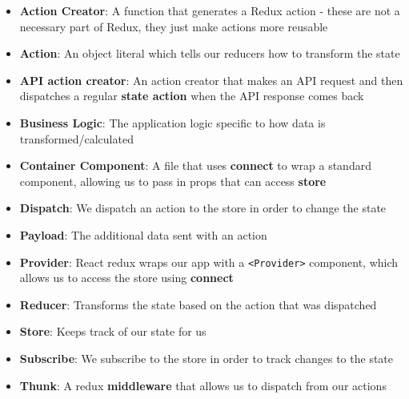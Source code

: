 \begin{itemize}[leftmargin=*]
    \item
        \textbf{Action Creator}:
        A function that generates a Redux action - these are not a necessary part of Redux, they just make actions more reusable
    \item
        \textbf{Action}:
        An object literal which tells our reducers how to transform the state
    \item
        \textbf{API action creator}:
        An action creator that makes an API request and then dispatches a regular \textbf{state action} when the API response comes back
    \item
        \textbf{Business Logic}:
        The application logic specific to how data is transformed/calculated
    \item
        \textbf{Container Component}:
        A file that uses \textbf{connect} to wrap a standard component, allowing us to pass in props that can access \textbf{store}
    \item
        \textbf{Dispatch}:
        We dispatch an action to the store in order to change the state
    \item
        \textbf{Payload}:
        The additional data sent with an action
    \item
        \textbf{Provider}:
        React redux wraps our app with a \texttt{<Provider>} component, which allows us to access the store using \textbf{connect}
    \item
        \textbf{Reducer}:
        Transforms the state based on the action that was dispatched
    \item
        \textbf{Store}:
        Keeps track of our state for us
    \item
        \textbf{Subscribe}:
        We subscribe to the store in order to track changes to the state
    \item
        \textbf{Thunk}:
        A redux \textbf{middleware} that allows us to dispatch from our actions
\end{itemize}
